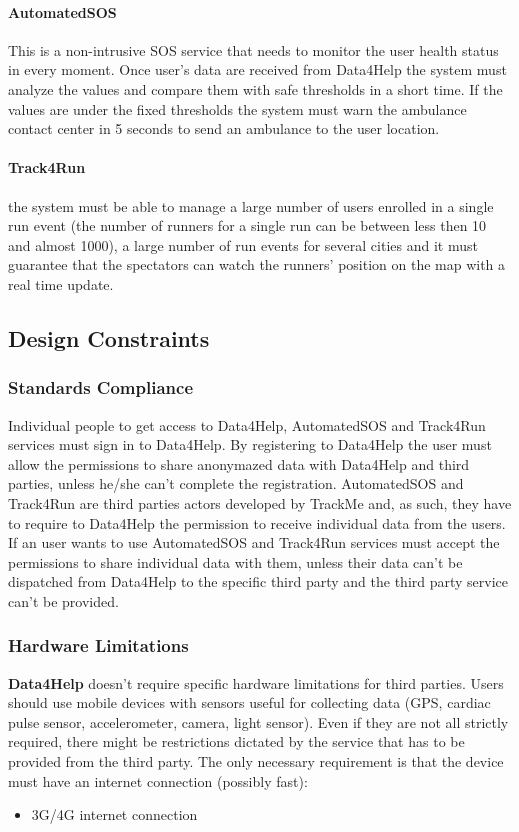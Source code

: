 \documentclass[a4paper]{article}
\begin{document}
\paragraph{AutomatedSOS} This is a non-intrusive SOS service that needs to monitor the user health status in every moment. Once user's data are received from Data4Help the system must analyze the values and compare them with safe thresholds in a short time. If the values are under the fixed thresholds the system must warn the ambulance contact center in 5 seconds to send an ambulance to the user location.

\paragraph{Track4Run} the system must be able to manage a large number of users enrolled in a single run event (the number of runners for a single run can be between less then 10 and almost 1000), a large number of run events for several cities and it must guarantee that the spectators can watch the runners' position on the map with a real time update.
\clearpage

\subsection{Design Constraints}

\subsubsection{Standards Compliance}
Individual people to get access to Data4Help, AutomatedSOS and Track4Run services must sign in to Data4Help. By registering to Data4Help the user must allow the permissions to share anonymazed data with Data4Help and third parties, unless he/she can't complete the registration.
AutomatedSOS and Track4Run are third parties actors developed by TrackMe and, as such, they have to require to Data4Help the permission to receive individual data from the users.
If an user wants to use AutomatedSOS and Track4Run services must accept the permissions to share individual data with them, unless their data can't be dispatched from Data4Help to the specific third party and the third party service can't be provided.

\vspace{0.5cm}

\subsubsection{Hardware Limitations}
\textbf{Data4Help} doesn't require specific hardware limitations for third parties. Users should use mobile devices with sensors useful for collecting data (GPS, cardiac pulse sensor, accelerometer, camera, light sensor). Even if they are not all strictly required, there might be restrictions dictated by the service that has to be provided from the third party. The only necessary requirement is that the device must have an internet connection (possibly fast):
\begin{itemize}
    \item 3G/4G internet connection
\end{itemize}
\end{document}
